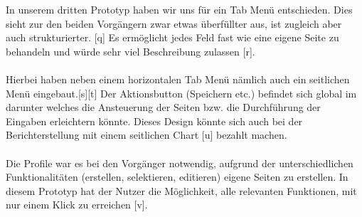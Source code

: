 \documentclass[runningheads,a4paper]{llncs}
\begin{document}
In unserem dritten Prototyp haben wir uns für ein Tab Menü entschieden. Dies sieht zur den beiden Vorgängern zwar etwas überfüllter aus, ist zugleich aber auch strukturierter. [q] Es ermöglicht jedes Feld fast wie eine eigene Seite zu behandeln und würde sehr viel Beschreibung zulassen [r].\\\\ Hierbei haben neben einem horizontalen Tab Menü nämlich auch ein seitlichen Menü eingebaut.[s][t] Der Aktionsbutton (Speichern etc.) befindet sich global im darunter welches die Ansteuerung der Seiten bzw. die Durchführung der Eingaben erleichtern könnte. Dieses Design könnte sich auch bei der Berichterstellung mit einem seitlichen Chart [u] bezahlt machen.\\\\ Die Profile war es bei den Vorgänger notwendig, aufgrund der unterschiedlichen Funktionalitäten (erstellen, selektieren, editieren) eigene Seiten zu erstellen. In diesem Prototyp hat der Nutzer die Möglichkeit, alle relevanten Funktionen, mit nur einem Klick zu erreichen [v]. 
\end{document}
